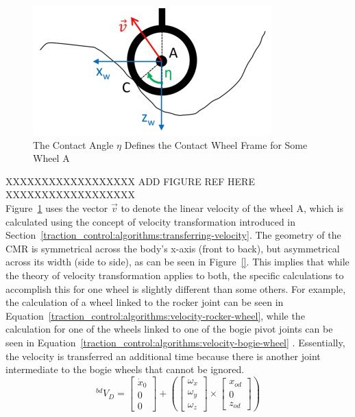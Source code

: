 \begin{figure}[H]
	\centering
	\includegraphics[width=.8\textwidth]{sections/algorithms/images/contact_angle.png}
	\caption{The Contact Angle $\eta$ Defines the Contact Wheel Frame for Some Wheel A \cite{tractl}}
	\label{traction_control:algorithms:contact-angle}
\end{figure}

XXXXXXXXXXXXXXXXXX
ADD FIGURE REF HERE
XXXXXXXXXXXXXXXXXX \\
Figure~\ref{traction_control:algorithms:contact-angle} uses the vector $\vec{v}$ to denote the linear velocity of the wheel A, which is calculated using the concept of velocity transformation introduced in Section~\ref{traction_control:algorithms:transferring-velocity}. The geometry of the \ac{CMR} is symmetrical across the body's x-axis (front to back), but asymmetrical across its width (side to side), as can be seen in Figure~\ref{}. This implies that while the theory of velocity transformation applies to both, the specific calculations to accomplish this for one wheel is slightly different than some others. For example, the calculation of a wheel linked to the rocker joint can be seen in Equation~\ref{traction_control:algorithms:velocity-rocker-wheel}, while the calculation for one of the wheels linked to one of the bogie pivot joints can be seen in Equation~\ref{traction_control:algorithms:velocity-bogie-wheel} \cite{tractl}. Essentially, the velocity is transferred an additional time because there is another joint intermediate to the bogie wheels that cannot be ignored. \\

\begin{equation}\label{traction_control:algorithms:velocity-body}
	{}^{bd}V_{D} = \left[\begin{array}{c}
		\dot{x}_0 \\
		0 \\
		0
	\end{array}\right] + \left(\left[\begin{array}{c}
		\omega_{x} \\
		\omega_{y} \\
		\omega_{z}
	\end{array}\right] \times \left[\begin{array}{c}
	x_{od} \\
	0 \\
	z_{od}
	\end{array}\right]\right)
\end{equation}

